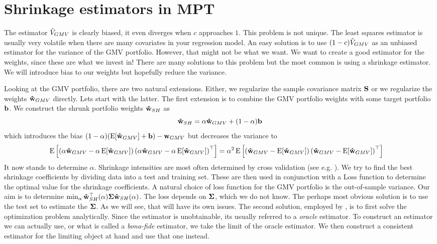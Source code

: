 \documentclass[]{book}\usepackage{knitr}
\begin{document}
\section{Shrinkage estimators in MPT}
The estimator $\hat{V}_{GMV}$ is clearly biased, it even diverges when $c$ approaches $1$. 
This problem is not unique. 
The least squares estimator is usually very volatile when there are many covariates in your regression model. 
An easy solution is to use $(1-c)\hat{V}_{GMV}$ as an unbiased estimator for the variance of the GMV portfolio.
However, that might not be what we want. 
We want to create a good estimator for the weights, since these are what we invest in! 
There are many solutions to this problem but the most common is using a shrinkage estimator. 
We will introduce bias to our weights but hopefully reduce the variance.

Looking at the GMV portfolio, there are two natural extensions. Either, we regularize the sample covariance matrix $\mathbf{S}$ or we regularize the weights $\mathbf{\hat{w}}_{GMV}$ directly. Lets start with the latter. The first extension is to combine the GMV portfolio weights with some target portfolio $\mathbf{b}$. We construct the shrunk portfolio weights $\mathbf{\hat{w}}_{SH}$ as
\begin{equation}
  \mathbf{\hat{w}}_{SH} = \alpha\mathbf{\hat{w}}_{GMV} + (1-\alpha)\mathbf{b}
\end{equation}
which introduces the bias $(1-\alpha)(\operatorname{E}[\mathbf{\hat{w}}_{GMV}]+\mathbf{b}) - \mathbf{w}_{GMV}$ but decreases the variance to
\begin{align}
  \operatorname{E}\left[\left(\alpha\mathbf{\hat{w}}_{GMV} - \alpha \operatorname{E}[\mathbf{\hat{w}}_{GMV}]\right)\left(\alpha\mathbf{\hat{w}}_{GMV} - \alpha \operatorname{E}[\mathbf{\hat{w}}_{GMV}]\right)^\top\right] 
  & = 
  \alpha^2\operatorname{E}\left[\left(\mathbf{\hat{w}}_{GMV} - \operatorname{E}[\mathbf{\hat{w}}_{GMV}]\right)\left(\mathbf{\hat{w}}_{GMV} - \operatorname{E}[\mathbf{\hat{w}}_{GMV}]\right)^\top\right]
\end{align}
It now stands to determine $\alpha$. 
Shrinkage intensities are most often determined by cross validation (see e.g. \citet[ch. 5]{james2013introduction}). 
We try to find the best shrinkage coefficients by dividing data into a test and training set.
These are then used in conjunction with a Loss function to determine the optimal value for the shrinkage coefficients.
A natural choice of loss function for the GMV portfolio is the out-of-sample variance.
Our aim is to determine $\min_\alpha \mathbf{\hat{w}}_{SH}^\top(\alpha) \mathbf{\Sigma} \mathbf{\hat{w}}_{SH}(\alpha)$.
The loss depends on $\mathbf{\Sigma}$, which we do not know.
The perhaps most obvious solution is to use the test set to estimate the $\mathbf{\Sigma}$. 
As we will see, that will have its own issues.
The second solution, employed by \citet{bodnar2018estimation}, is to first solve the optimization problem analytically.
Since the estimator is unobtainable, its usually referred to a \textit{oracle} estimator. 
To construct an estimator we can actually use, or what is called a \textit{bona-fide} estimator, we take the limit of the oracle estimator.
We then construct a consistent estimator for the limiting object at hand and use that one instead.
\end{document}
